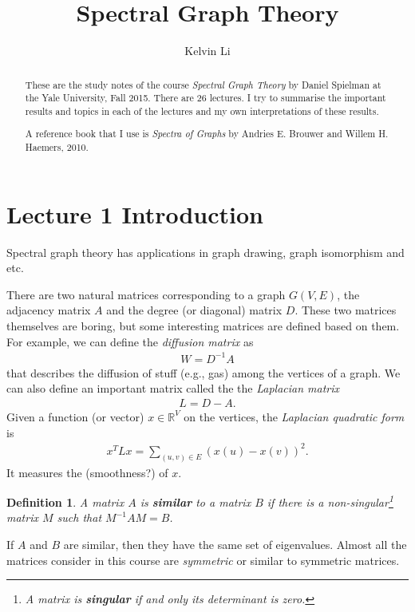 \documentclass[]{article}
\title{Spectral Graph Theory}
\author{Kelvin Li}
\newtheorem{definition}{Definition}[section] %
\begin{document}
	
	\maketitle
	
	\begin{abstract}
		These are the study notes of the course \textit{Spectral Graph Theory} by Daniel Spielman at the Yale University, Fall 2015. There are 26 lectures. I try to summarise the important results and topics in each of the lectures and my own interpretations of these results. 
		
		A reference book that I use is \textit{Spectra of Graphs} by Andries E. Brouwer and Willem H. Haemers, 2010. 
	\end{abstract}
	
	\section{Lecture 1 Introduction}
	Spectral graph theory has applications in graph drawing, graph isomorphism and etc.
	
	There are two natural matrices corresponding to a graph $G(V,E)$, the adjacency matrix $A$ and the degree (or diagonal) matrix $D$. These two matrices themselves are boring, but some interesting matrices are defined based on them. For example, we can define the \textit{diffusion matrix} as
	\begin{align*}
	W = D^{-1}A
	\end{align*} 
	that describes the diffusion of stuff (e.g., gas) among the vertices of a graph. We can also define an important matrix called the the \textit{Laplacian matrix} 
	\begin{align*}
	L=D-A.
	\end{align*}
	Given a function (or vector) $x \in \mathbb{R}^V$ on the vertices, the \textit{Laplacian quadratic form} is 
	\begin{align*}
	x^T L x = \sum_{(u,v)\in E} (x(u) - x(v))^2.
	\end{align*}
	It measures the (smoothness?) of $x$. 
	
	\begin{definition}
		A matrix $A$ is \textbf{similar} to a matrix $B$ if there is a non-singular\footnote{A matrix is \textbf{singular} if and only its determinant is zero.} matrix $M$ such that $M^{-1}AM=B$. 
	\end{definition}
	If $A$ and $B$ are similar, then they have the same set of eigenvalues. Almost all the matrices consider in this course are \textit{symmetric} or similar to symmetric matrices. 
	
\end{document}
